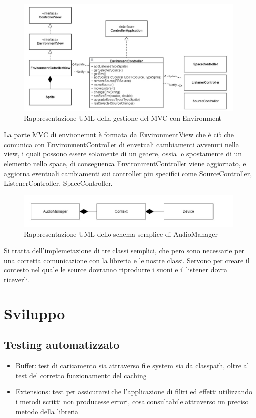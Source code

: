 \documentclass[a4paper,12pt]{report}
\begin{document}
%
\begin{figure}[H]
\centering{}
\includegraphics[width=\textwidth]{img/EnvironmentMVC.png}
\caption{Rappresentazione UML della gestione del MVC con Environment}
\label{img:environmentmvc}
\end{figure}
La parte MVC di environemnt è formata da EnvironmentView che è ciò che comunica con EnvironmentController di envetuali cambiamenti avvenuti nella view, i quali possono essere solamente di un genere, ossia lo spostamente di un elemento nello space, di conseguenza EnvironmentController viene aggiornato, e aggiorna eventuali cambiamenti sui controller piu specifici come SourceController, ListenerController, SpaceController.
%
\begin{figure}[H]
\centering{}
\includegraphics[width=\textwidth]{img/AudioManager.png}
\caption{Rappresentazione UML dello schema semplice di AudioManager}
\label{img:audiomanager}
\end{figure}
Si tratta dell'implemetazione di tre classi semplici, che pero sono necessarie per una corretta comunicazione con la libreria e le nostre classi. Servono per creare il contesto nel quale le source dovranno riprodurre i suoni e il listener dovra riceverli.
%

\chapter{Sviluppo}
\section{Testing automatizzato}
\begin{itemize}
	\item Buffer: test di caricamento sia attraverso file system sia da classpath, oltre al test del corretto funzionamento del caching
	\item Extensions: test per assicurarsi che l’applicazione di filtri ed effetti utilizzando i metodi scritti non producesse errori, cosa consultabile attraverso un preciso metodo della libreria
\end{itemize}
\end{document}
